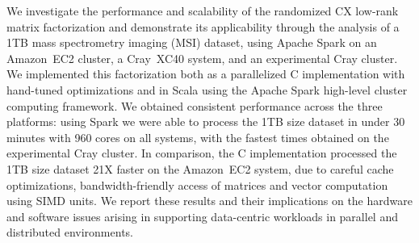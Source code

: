 We investigate the performance and scalability of the randomized CX low-rank
matrix factorization and demonstrate its applicability through the analysis of
a 1TB mass spectrometry imaging (MSI) dataset, using Apache Spark on an
Amazon~EC2 cluster, a Cray~XC40 system, and an experimental Cray cluster. We
implemented this factorization both as a parallelized C implementation with
hand-tuned optimizations and in Scala using the Apache Spark high-level cluster
computing framework. We obtained consistent performance across the three
platforms: using Spark we were able to process the 1TB size dataset in under 30
minutes with 960 cores on all systems, with the fastest times obtained on the
experimental Cray cluster. In comparison, the C implementation processed the
1TB size dataset 21X faster on the Amazon~EC2 system, due to careful cache
optimizations, bandwidth-friendly access of matrices and vector computation
using SIMD units.  We report these results and their implications on the
hardware and software issues arising in supporting data-centric workloads in
parallel and distributed environments.
